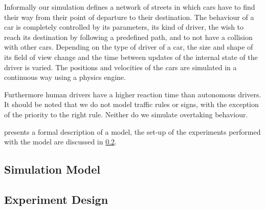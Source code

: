 Informally our simulation defines a network of streets in which cars have to find their way from their point of departure to their destination. The behaviour of a car is completely controlled by its parameters, its kind of driver, the wish to reach its destination by following a predefined path, and to not have a collision with other cars. Depending on the type of driver of a car, the size and shape of its field of view change and the time between updates of the internal state of the driver is varied. The positions and velocities of the cars are simulated in a continuous way using a physics engine.

Furthermore human drivers have a higher reaction time than autonomous drivers. It should be noted that we do not model traffic rules or signs, with the exception of the priority to the right rule. Neither do we simulate overtaking behaviour.

 presents a formal description of a model, the set-up of the experiments performed with the model are discussed in \cref{sub:method:design}.

\subsection{Simulation Model}
\label{sub:method:model}


\subsection{Experiment Design}
\label{sub:method:design}
